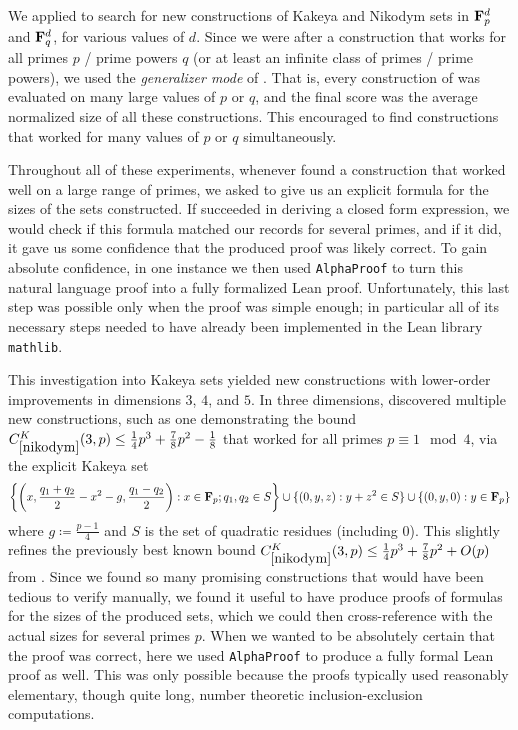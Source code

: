 We applied \AlphaEvolve to search for new constructions of Kakeya and Nikodym sets in $\mathbf{F}_p^d$ and $\mathbf{F}_q^d$, for various values of $d$. Since we were after a construction that works for all primes $p$ / prime powers $q$ (or at least an infinite class of primes / prime powers), we used the \emph{generalizer mode} of \AlphaEvolve. That is, every construction of \AlphaEvolve was evaluated on many large values of $p$ or $q$, and the final score was the average normalized size of all these constructions. This encouraged \AlphaEvolve to find constructions that worked for many values of $p$ or $q$ simultaneously.

Throughout all of these experiments, whenever \AlphaEvolve found a construction that worked well on a large range of primes, we asked \DeepThink to give us an explicit formula for the sizes of the sets constructed. If \DeepThink succeeded in deriving a closed form expression, we would check if this formula matched our records for several primes, and if it did, it gave us some confidence that the \DeepThink produced proof was likely correct. To gain absolute confidence, in one instance we then used \texttt{AlphaProof} to turn this natural language proof into a fully formalized Lean proof. 
Unfortunately, this last step was possible only when the proof was simple enough; in particular all of its necessary steps needed to have already been implemented in the Lean library \texttt{mathlib}.


This investigation into Kakeya sets yielded new constructions with lower-order improvements in dimensions $3$, $4$, and $5$. In three dimensions, \AlphaEvolve discovered multiple new constructions, such as one demonstrating the bound $C^K_{\ref{nikodym}}(3,p) \leq \frac{1}{4} p^3 + \frac{7}{8} p^2 - \frac{1}{8}$  that worked for all primes $p\equiv 1\mod 4$, via the explicit Kakeya set
$$ \left\{ \left(x,\frac{q_1+q_2}{2}-x^2-g,\frac{q_1-q_2}{2}\right) : x \in \mathbf{F}_p; q_1,q_2 \in S \right\} \cup \{ (0,y,z): y+z^2 \in S \} \cup \{(0,y,0): y \in \mathbf{F}_p \}$$
where $g \coloneqq \frac{p-1}{4}$ and $S$ is the set of quadratic residues (including $0$).  This slightly refines the previously best known bound $C^K_{\ref{nikodym}}(3,p) \leq \frac{1}{4} p^3 + \frac{7}{8} p^2 + O(p)$ from \cite{bukh-chao}. 
Since we found so many promising constructions that would have been tedious to verify manually, we found it useful to have \DeepThink produce proofs of formulas for the sizes of the produced sets, which we could then cross-reference with the actual sizes for several primes $p$. When we wanted to be absolutely certain that the proof was correct, here we used \texttt{AlphaProof} to produce a fully formal Lean proof as well. This was only possible because the proofs typically used reasonably elementary, though quite long, number theoretic inclusion-exclusion computations.

